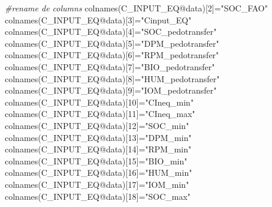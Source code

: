 \documentclass[
  10pt,
  b5paper,
]{book}
\newenvironment{Shaded}{\begin{snugshade}}{\end{snugshade}}
\newcommand{\CommentTok}[1]{\textcolor[rgb]{0.56,0.35,0.01}{\textit{#1}}}
\newcommand{\DecValTok}[1]{\textcolor[rgb]{0.00,0.00,0.81}{#1}}
\newcommand{\FunctionTok}[1]{\textcolor[rgb]{0.00,0.00,0.00}{#1}}
\newcommand{\NormalTok}[1]{#1}
\newcommand{\OtherTok}[1]{\textcolor[rgb]{0.56,0.35,0.01}{#1}}
\newcommand{\SpecialCharTok}[1]{\textcolor[rgb]{0.00,0.00,0.00}{#1}}
\newcommand{\StringTok}[1]{\textcolor[rgb]{0.31,0.60,0.02}{#1}}
\begin{document}
\begin{Shaded}
\begin{Highlighting}[]
\CommentTok{\#rename de columns}
\FunctionTok{colnames}\NormalTok{(C\_INPUT\_EQ}\SpecialCharTok{@}\NormalTok{data)[}\DecValTok{2}\NormalTok{]}\OtherTok{=}\StringTok{"SOC\_FAO"}
\FunctionTok{colnames}\NormalTok{(C\_INPUT\_EQ}\SpecialCharTok{@}\NormalTok{data)[}\DecValTok{3}\NormalTok{]}\OtherTok{=}\StringTok{"Cinput\_EQ"}
\FunctionTok{colnames}\NormalTok{(C\_INPUT\_EQ}\SpecialCharTok{@}\NormalTok{data)[}\DecValTok{4}\NormalTok{]}\OtherTok{=}\StringTok{"SOC\_pedotransfer"}
\FunctionTok{colnames}\NormalTok{(C\_INPUT\_EQ}\SpecialCharTok{@}\NormalTok{data)[}\DecValTok{5}\NormalTok{]}\OtherTok{=}\StringTok{"DPM\_pedotransfer"}
\FunctionTok{colnames}\NormalTok{(C\_INPUT\_EQ}\SpecialCharTok{@}\NormalTok{data)[}\DecValTok{6}\NormalTok{]}\OtherTok{=}\StringTok{"RPM\_pedotransfer"}
\FunctionTok{colnames}\NormalTok{(C\_INPUT\_EQ}\SpecialCharTok{@}\NormalTok{data)[}\DecValTok{7}\NormalTok{]}\OtherTok{=}\StringTok{"BIO\_pedotransfer"}
\FunctionTok{colnames}\NormalTok{(C\_INPUT\_EQ}\SpecialCharTok{@}\NormalTok{data)[}\DecValTok{8}\NormalTok{]}\OtherTok{=}\StringTok{"HUM\_pedotransfer"}
\FunctionTok{colnames}\NormalTok{(C\_INPUT\_EQ}\SpecialCharTok{@}\NormalTok{data)[}\DecValTok{9}\NormalTok{]}\OtherTok{=}\StringTok{"IOM\_pedotransfer"}
\FunctionTok{colnames}\NormalTok{(C\_INPUT\_EQ}\SpecialCharTok{@}\NormalTok{data)[}\DecValTok{10}\NormalTok{]}\OtherTok{=}\StringTok{"CIneq\_min"}
\FunctionTok{colnames}\NormalTok{(C\_INPUT\_EQ}\SpecialCharTok{@}\NormalTok{data)[}\DecValTok{11}\NormalTok{]}\OtherTok{=}\StringTok{"CIneq\_max"}
\FunctionTok{colnames}\NormalTok{(C\_INPUT\_EQ}\SpecialCharTok{@}\NormalTok{data)[}\DecValTok{12}\NormalTok{]}\OtherTok{=}\StringTok{"SOC\_min"}
\FunctionTok{colnames}\NormalTok{(C\_INPUT\_EQ}\SpecialCharTok{@}\NormalTok{data)[}\DecValTok{13}\NormalTok{]}\OtherTok{=}\StringTok{"DPM\_min"}
\FunctionTok{colnames}\NormalTok{(C\_INPUT\_EQ}\SpecialCharTok{@}\NormalTok{data)[}\DecValTok{14}\NormalTok{]}\OtherTok{=}\StringTok{"RPM\_min"}
\FunctionTok{colnames}\NormalTok{(C\_INPUT\_EQ}\SpecialCharTok{@}\NormalTok{data)[}\DecValTok{15}\NormalTok{]}\OtherTok{=}\StringTok{"BIO\_min"}
\FunctionTok{colnames}\NormalTok{(C\_INPUT\_EQ}\SpecialCharTok{@}\NormalTok{data)[}\DecValTok{16}\NormalTok{]}\OtherTok{=}\StringTok{"HUM\_min"}
\FunctionTok{colnames}\NormalTok{(C\_INPUT\_EQ}\SpecialCharTok{@}\NormalTok{data)[}\DecValTok{17}\NormalTok{]}\OtherTok{=}\StringTok{"IOM\_min"}
\FunctionTok{colnames}\NormalTok{(C\_INPUT\_EQ}\SpecialCharTok{@}\NormalTok{data)[}\DecValTok{18}\NormalTok{]}\OtherTok{=}\StringTok{"SOC\_max"}

\end{Highlighting}
\end{Shaded}
\end{document}
